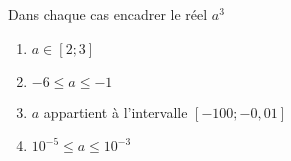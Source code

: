 
Dans chaque cas encadrer le réel $ a^3$
\begin{enumerate}
\item $a \in [2;3]$
\item $-6 \leq a \leq -1$
\item $a$ appartient à l'intervalle $[-100;-0,01]$
\item $10^{-5} \leq a \leq 10^{-3}$
\end{enumerate}